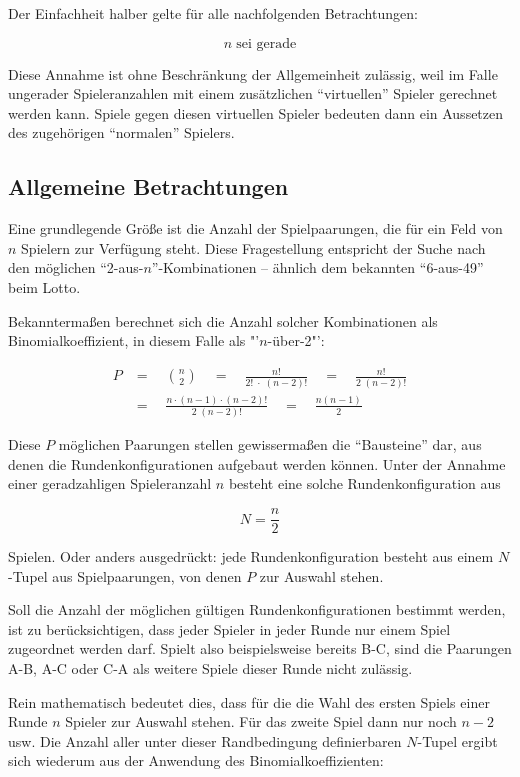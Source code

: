 \documentclass[DIV=15, 10pt]{scrartcl}
\begin{document}
Der Einfachheit halber gelte für alle nachfolgenden Betrachtungen:

\[
n \; \text{sei gerade}
\]

Diese Annahme ist ohne Beschränkung der Allgemeinheit zulässig, weil im Falle ungerader Spieleranzahlen mit einem zusätzlichen "`virtuellen"' Spieler gerechnet werden kann. Spiele gegen diesen virtuellen Spieler bedeuten dann ein Aussetzen des zugehörigen "`normalen"' Spielers.

\subsection{Allgemeine Betrachtungen}

Eine grundlegende Größe ist die Anzahl der Spielpaarungen, die für ein Feld von $n$ Spielern zur Verfügung steht. Diese Fragestellung entspricht der Suche nach den möglichen "`2-aus-$n$"'-Kombinationen -- ähnlich dem bekannten "`6-aus-49"' beim Lotto.

Bekanntermaßen berechnet sich die Anzahl solcher Kombinationen als Binomialkoeffizient, in diesem Falle als "'$n$-über-2"':

\begin{align}
P &= \quad {{n}\choose{2}} \quad = \quad \frac{n!}{2! \; \cdot \; (n - 2)!} \quad
= \quad \frac{n!}{2 \; (n - 2)!} \nonumber \\[3mm]
&=\quad \frac{n \cdot (n - 1) \cdot (n - 2)!}{2 \; (n - 2)!} \quad = \quad
\frac{n(n-1)}{2}
\end{align}

Diese $P$ möglichen Paarungen stellen gewissermaßen die "`Bausteine"' dar, aus denen die Rundenkonfigurationen aufgebaut werden können. Unter der Annahme einer geradzahligen Spieleranzahl $n$ besteht eine solche Rundenkonfiguration aus

\begin{equation}
N = \frac{n}{2}
\end{equation}

Spielen. Oder anders ausgedrückt: jede Rundenkonfiguration besteht aus einem $N$-Tupel  aus Spielpaarungen, von denen $P$ zur Auswahl stehen.

Soll die Anzahl der möglichen gültigen Rundenkonfigurationen bestimmt werden, ist zu berücksichtigen, dass jeder Spieler in jeder Runde nur einem Spiel zugeordnet werden darf. Spielt also beispielsweise bereits B-C, sind die Paarungen A-B, A-C oder C-A als weitere Spiele dieser Runde nicht zulässig.

Rein mathematisch bedeutet dies, dass für die die Wahl des ersten Spiels einer Runde $n$ Spieler zur Auswahl stehen. Für das zweite Spiel dann nur noch $n-2$ usw. Die Anzahl aller unter dieser Randbedingung definierbaren $N$-Tupel ergibt sich wiederum aus der Anwendung des Binomialkoeffizienten:
\end{document}
